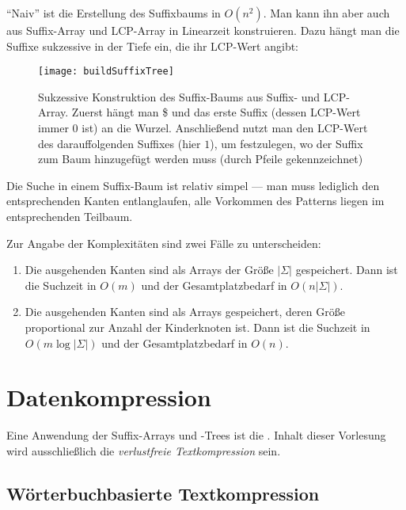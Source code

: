 ``Naiv'' ist die Erstellung des Suffixbaums in \( O(n^2) \). Man kann ihn aber auch aus Suffix-Array und LCP-Array in Linearzeit konstruieren. Dazu hängt man die Suffixe sukzessive in der Tiefe ein, die ihr LCP-Wert angibt:

\begin{figure}[H]
  \texttt{[image: buildSuffixTree]}
  \caption{Sukzessive Konstruktion des Suffix-Baums aus Suffix- und LCP-Array. Zuerst hängt man \$ und das erste Suffix (dessen LCP-Wert immer \( 0 \) ist) an die Wurzel. Anschließend nutzt man den LCP-Wert des darauffolgenden Suffixes (hier \( 1 \)), um festzulegen, wo der Suffix zum Baum hinzugefügt werden muss (durch Pfeile gekennzeichnet)}
\end{figure}

Die Suche in einem Suffix-Baum ist relativ simpel --- man muss lediglich den entsprechenden Kanten entlanglaufen, alle Vorkommen des Patterns liegen im entsprechenden Teilbaum.

Zur Angabe der Komplexitäten sind zwei Fälle zu unterscheiden:

\begin{enumerate}
  \item Die ausgehenden Kanten sind als Arrays der Größe \( \left\vert \Sigma \right\vert \) gespeichert. Dann ist die Suchzeit in \textcolor{green!60!black}{\( O(m) \)} und der Gesamtplatzbedarf in \textcolor{red!80!black}{\( O(n\left\vert \Sigma \right\vert) \)}.
  \item Die ausgehenden Kanten sind als Arrays gespeichert, deren Größe proportional zur Anzahl der Kinderknoten ist. Dann ist die Suchzeit in \textcolor{red!80!black}{\( O(m\log \left\vert \Sigma \right\vert ) \)} und der Gesamtplatzbedarf in \textcolor{green!60!black}{\( O(n) \)}.
\end{enumerate}

\section{Datenkompression}

Eine Anwendung der Suffix-Arrays und -Trees ist die . Inhalt dieser Vorlesung wird ausschließlich die \emph{verlustfreie Textkompression} sein.

\subsection{Wörterbuchbasierte Textkompression}

